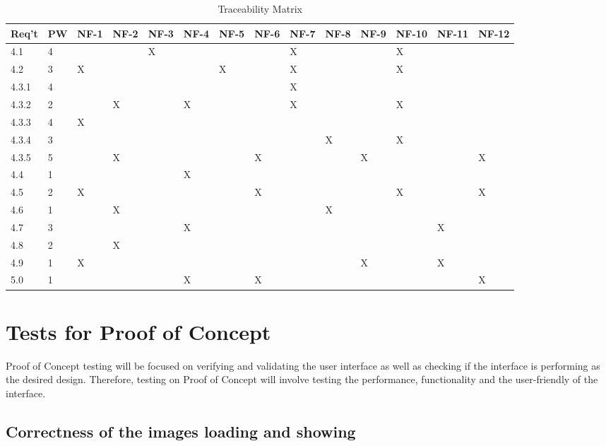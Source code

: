 \documentclass[12pt, titlepage]{article}
\begin{document}
	\begin{table}[h!]
    \caption{Traceability Matrix}
    \begin{center}
	\begin{tabular}{|p{1cm}|p{1.0cm}|p{0.5cm}p{0.5cm}p{0.5cm}p{0.5cm}p{0.5cm}p{0.5cm}p{0.5cm}p{0.5cm}p{0.5cm}p{0.5cm}p{0.5cm}p{0.5cm}|}
	\hline
	\textbf{Req't} & \textbf{PW} & \textbf{NF-1} & \textbf{NF-2} &\textbf{NF-3} & \textbf{NF-4} & \textbf{NF-5} & \textbf{NF-6} & \textbf{NF-7} & \textbf{NF-8} & \textbf{NF-9} & \textbf{NF-10} & \textbf{NF-11} & \textbf{NF-12} \\
	\hline
	\hline
      4.1 &4 & & & X& & & & X& & & X&& \\
      4.2 &3 & X& & & &X & & X& & & X & &\\
      4.3.1 & 4 & & & & & & & X& & & & &\\
      4.3.2 &2 & &X & &X & & & X& & &X & &\\
      4.3.3 & 4&X & & & & & & & & & & &\\
      4.3.4 &3 & & & & & & & &X & &X & &\\
      4.3.5 &5 & & X& & & & X& & &X & & &X \\
      4.4 &1 & & & & X& & & & & & & &\\
      4.5 &2 & X& & & & &X & & & & X& &X\\
      4.6 &1 & &X & & & & & & X& & & &\\
      4.7 &3 & & & & X& & & & & & &X &\\
      4.8 &2 & &X & & & & & & & & & &\\
      4.9 &1 & X& & & & & & & &X & &X &\\
      5.0 &1 & & & & X& & X& & & & & &X\\
      \hline
	\end{tabular}
    \end{center}
	\end{table}
	\newpage
	
\section{Tests for Proof of Concept}
Proof of Concept testing will be focused on verifying and validating the user interface as well as checking if the interface is performing as the desired design. Therefore, testing on Proof of Concept will involve testing the performance, functionality and the user-friendly of the interface.
\subsection{Correctness of the images loading and showing}
		
\end{document}
